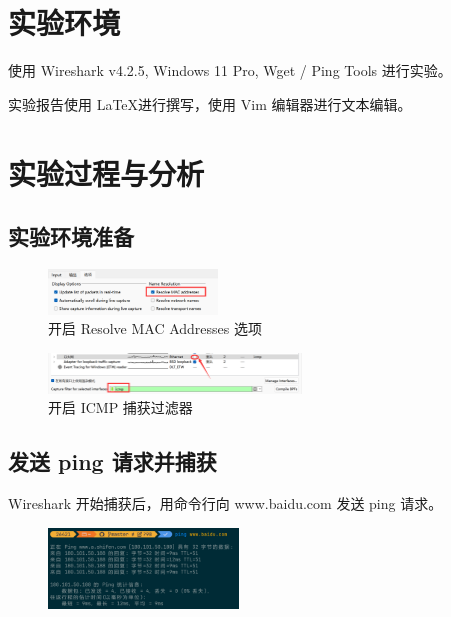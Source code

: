 \documentclass[14pt,a4paper,UTF8,twoside]{article}
\begin{document}
\section{实验环境}

使用 Wireshark v4.2.5, Windows 11 Pro, Wget / Ping Tools 进行实验。

实验报告使用 \LaTeX 进行撰写，使用 Vim 编辑器进行文本编辑。

\section{实验过程与分析}

\subsection{实验环境准备}

\begin{figure}[H]
  \centering
  \includegraphics[width=0.4\textwidth]{lab2/rename.png}
  \caption{开启 Resolve MAC Addresses 选项}
  \label{fig:wireshark}
\end{figure}

\begin{figure} [H]
  \centering
  \includegraphics[width=0.6\textwidth]{lab2/icmp.png}
  \caption{开启 ICMP 捕获过滤器}
  \label{fig:icmp}
\end{figure}

\subsection{发送 ping 请求并捕获}

Wireshark 开始捕获后，用命令行向 www.baidu.com 发送 ping 请求。

\begin{figure} [H]
  \centering
  \includegraphics[width=0.45\textwidth]{lab2/ping.png}
  \label{fig:ping}
\end{figure}
\end{document}
